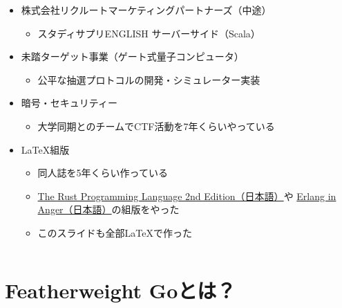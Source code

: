 \begin{frame}
\begin{columns}
\begin{column}{0.78\textwidth}
\begin{itemize}
        \item 株式会社リクルートマーケティングパートナーズ（中途）
        \begin{itemize}
          \item スタディサプリENGLISH サーバーサイド（Scala）
        \end{itemize}

        \item 未踏ターゲット事業（ゲート式量子コンピュータ）
        \begin{itemize}
          \item 公平な抽選プロトコルの開発・シミュレーター実装
        \end{itemize}

        \item 暗号・セキュリティー
        \begin{itemize}
          \item 大学同期とのチームでCTF活動を7年くらいやっている
        \end{itemize}

        \item {\LaTeX}組版
        \begin{itemize}
          \item 同人誌を5年くらい作っている
          \item \href{https://github.com/rust-lang-ja/book-ja-pdf}{The Rust Programming Language 2nd Edition（日本語）}や
          \href{https://github.com/ymotongpoo/erlang-in-anger}{Erlang in Anger（日本語）}の組版をやった
          \item このスライドも全部{\LaTeX}で作った
        \end{itemize}
      \end{itemize}
    \end{column}
  \end{columns}
\end{frame}

\section{Featherweight Goとは？}


